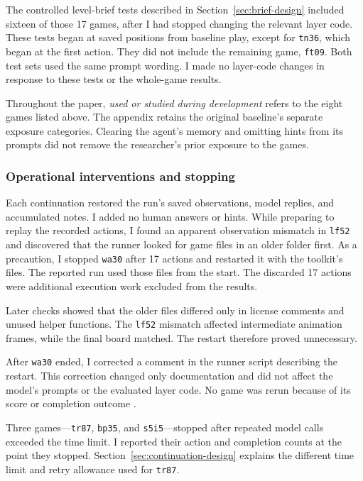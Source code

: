 The controlled level-brief tests described in Section~\ref{sec:brief-design} included sixteen of those 17 games, after I had stopped changing the relevant layer code. These tests began at saved positions from baseline play, except for \texttt{tn36}, which began at the first action. They did not include the remaining game, \texttt{ft09}. Both test sets used the same prompt wording. I made no layer-code changes in response to these tests or the whole-game results.

Throughout the paper, \emph{used or studied during development} refers to the eight games listed above. The appendix retains the original baseline's separate exposure categories. Clearing the agent's memory and omitting hints from its prompts did not remove the researcher's prior exposure to the games.

\subsubsection{Operational interventions and stopping}
Each continuation restored the run’s saved observations, model replies, and accumulated notes. I added no human answers or hints. While preparing to replay the recorded actions, I found an apparent observation mismatch in \texttt{lf52} and discovered that the runner looked for game files in an older folder first. As a precaution, I stopped \texttt{wa30} after 17 actions and restarted it with the toolkit’s files. The reported run used those files from the start. The discarded 17 actions were additional execution work excluded from the results.

Later checks showed that the older files differed only in license comments and unused helper functions. The \texttt{lf52} mismatch affected intermediate animation frames, while the final board matched. The restart therefore proved unnecessary. 

After \texttt{wa30} ended, I corrected a comment in the runner script describing the restart. This correction changed only documentation and did not affect the model’s prompts or the evaluated layer code. No game was rerun because of its score or completion outcome \citep{dai2026replaycorrection}.

Three games---\texttt{tr87}, \texttt{bp35}, and \texttt{s5i5}---stopped after repeated model calls exceeded the time limit. I reported their action and completion counts at the point they stopped. Section~\ref{sec:continuation-design} explains the different time limit and retry allowance used for \texttt{tr87}.

